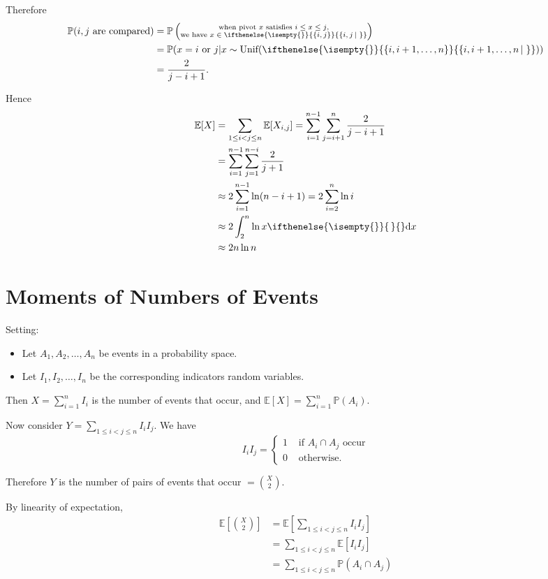 \documentclass[a4paper,11pt]{amsbook}
\theoremstyle{definition}
\theoremstyle{remark}
\newcommand{\E}{\mathbb{E}}
\renewcommand{\P}{\mathbb{P}}
\newcommand\0{\varnothing}
\newcommand\dx[1][]{\ifthenelse{\isempty{#1}}{\,}{}\mathrm{d}x}
\newcommand\Unif{\text{Unif}}
\newcommand\set[2][]
{
    \ifthenelse{\isempty{#1}}
    {
        \left\{#2\right\}
    }
    {
        \left\{#2\left|\,#1\right.\right\}
    }
}
\begin{document}
    Therefore \begin{align*}
        \P(i,j\text{ are compared})&=\P\left(\substack{\text{when pivot $x$ satisfies $i\leq x\leq j$,} \\ \text{we have $x\in\set{i,j}$}}\right) \\
        &=\P(x=i\text{ or }j|x\sim\Unif(\set{i,i+1,\ldots,n})) \\
        &=\frac{2}{j-i+1}.
    \end{align*}

    Hence \begin{align*}
        \E[X]&=\sum_{1\leq i<j\leq n}\E[X_{i,j}]=\sum_{i=1}^{n-1}\sum_{j=i+1}^n\frac{2}{j-i+1} \\
        &=\sum_{i=1}^{n-1}\sum_{j=1}^{n-i}\frac{2}{j+1} \\
        &\approx2\sum_{i=1}^{n-1}\ln(n-i+1)=2\sum_{i=2}^n\ln i \\
        &\approx2\int_2^n\ln x\dx \\
        &\approx2n\ln n
    \end{align*}

\chapter{Moments of Numbers of Events}

    Setting:
    \begin{itemize}
        \item Let $A_1,A_2,\ldots,A_n$ be events in a probability space.
        \item Let $I_1,I_2,\ldots,I_n$ be the corresponding indicators random variables.
    \end{itemize}

    Then $X=\sum_{i=1}^nI_i$ is the number of events that occur, and $\E[X]=\sum_{i=1}^n\P(A_i)$.

    Now consider $Y=\sum_{1\leq i<j\leq n}I_iI_j$. We have $$I_iI_j=\begin{cases}
        1 & \text{ if }A_i\cap A_j\text{ occur} \\
        0 & \text{ otherwise.}
    \end{cases}$$

    Therefore $Y$ is the number of pairs of events that occur $=\binom X2$.

    By linearity of expectation, \begin{align*}
        \E\left[\binom X2\right]&=\E\left[\sum_{1\leq i<j\leq n}I_iI_j\right] \\
        &=\sum_{1\leq i<j\leq n}\E[I_iI_j] \\
        &=\sum_{1\leq i<j\leq n}\P(A_i\cap A_j)
    \end{align*}
\end{document}
